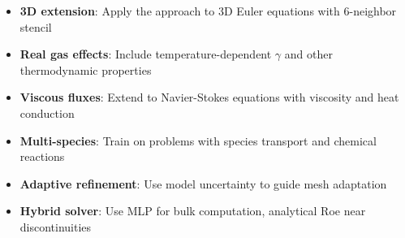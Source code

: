 \documentclass[11pt,a4paper]{article}
\begin{document}
\begin{itemize}
    \item \textbf{3D extension}: Apply the approach to 3D Euler equations with 6-neighbor stencil
    \item \textbf{Real gas effects}: Include temperature-dependent $\gamma$ and other thermodynamic properties
    \item \textbf{Viscous fluxes}: Extend to Navier-Stokes equations with viscosity and heat conduction
    \item \textbf{Multi-species}: Train on problems with species transport and chemical reactions
    \item \textbf{Adaptive refinement}: Use model uncertainty to guide mesh adaptation
    \item \textbf{Hybrid solver}: Use MLP for bulk computation, analytical Roe near discontinuities
\end{itemize}
\end{document}
